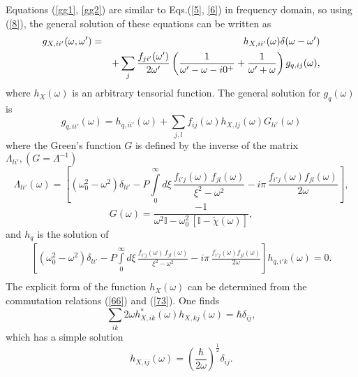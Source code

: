 \documentclass[preprint,showpacs,showkeys,groupedaddress,superscriptaddress]{revtex4}
\begin{document}
Equations (\ref{gg1}, \ref{gg2}) are similar to Eqs.(\ref{5}, \ref{6}) in frequency domain, so using (\ref{8}), the general solution of these equations can be written as
\begin{eqnarray}\label{73}
g_{X,ii'} (\omega ,\omega ') &=& h_{X,ii'} (\omega )\delta (\omega  - \omega ') \nonumber\\
&&+ \sum\limits_j {\frac{{f_{ji'} (\omega ')}}{{2\omega '}}} \left( {\frac{{\rm 1}}{{\omega ' - \omega  - i0^ +  }} + \frac{{\rm 1}}{{\omega ' + \omega }}} \right)g_{q,ij} (\omega ),
\end{eqnarray}
where $h_{X}(\omega)$ is an arbitrary tensorial function. The general solution for $g_{q}(\omega)$ is
\begin{equation}
g_{q,ii'} (\omega ) = h_{q,ii'} (\omega ) + \sum\limits_{j,l} {f_{ij} (\omega )h_{X,lj} (\omega )G_{li'} (\omega )}
\end{equation}
where the Green's function $G$ is defined by the inverse of the matrix $\Lambda_{li'}, (G=\Lambda^{-1})$
\begin{equation}\label{75}
\Lambda_{li'} (\omega ) = \left[(\omega_0 ^2  - \omega^2 )\delta _{li'}  - P\int\limits_0^\infty d\xi \,\frac{f_{i'j} (\omega )\,f_{jl} (\omega )}
{\xi ^2  - \omega ^2 } - i\pi\,\frac{f_{i'j} (\omega )f_{jl} (\omega )}{2\omega}\right],
\end{equation}
\begin{equation}\label{Gkapa}
G (\omega ) = \frac{-1}{\omega^2 \mathbb{I}-\omega _0^2 \,[\mathbb{I}-\tilde{\chi} (\omega )]},
\end{equation}
and $h_{q}$ is the solution of
\begin{eqnarray}\label{hq}
\left[(\omega_0 ^2  - \omega^2 )\delta _{li'} - P\int\limits_0^\infty d\xi \,\frac{f_{i'j} (\omega )\,f_{jl} (\omega )}
{\xi ^2  - \omega ^2 } - i\pi\,\frac{f_{i'j} (\omega )f_{jl} (\omega )}{2\omega}\right] h_{q,i'k} (\omega ) = 0.\nonumber\\
\end{eqnarray}
The explicit form of the function $h_X(\omega)$ can be determined from the commutation relations (\ref{66}) and (\ref{73}). One finds
\begin{equation}
\sum\limits_{ik} {2\omega h_{X,ik}^* (\omega )h_{X,kj} (\omega ) = \hbar } \delta _{ij},
\end{equation}
which has a simple solution
\begin{equation}\label{79}
h_{X,ij} (\omega ) = \left( {\frac{\hbar }{{2\omega }}} \right)^{\frac{1}{2}} \delta _{ij}.
\end{equation}
\end{document}

